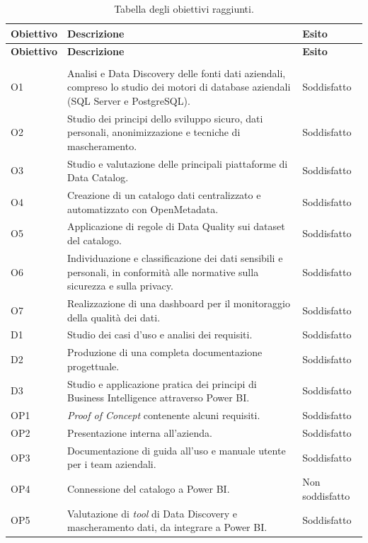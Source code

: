 \begin{longtable}{ p{} p{} p{} }
\toprule
\textbf{Obiettivo} & \textbf{Descrizione} & \textbf{Esito} \\
\midrule
\endfirsthead

\toprule
\textbf{Obiettivo} & \textbf{Descrizione} & \textbf{Esito} \\
\midrule
\endhead

\midrule
\noalign{\vspace{10pt}}
\caption[]{Tabella degli obiettivi raggiunti.} \\
\endfoot

\bottomrule
\noalign{\vspace{10pt}}
\caption{Tabella degli obiettivi raggiunti.}
\label{tab:obiettivi-raggiunti}
\endlastfoot
    O1 & Analisi e Data Discovery delle fonti dati aziendali, compreso lo studio dei motori di database aziendali (SQL Server e PostgreSQL). & Soddisfatto\\ \midrule
    O2 & Studio dei principi dello sviluppo sicuro, dati personali, anonimizzazione e tecniche di mascheramento. & Soddisfatto\\ \midrule
    O3 & Studio e valutazione delle principali piattaforme di Data Catalog. & Soddisfatto\\ \midrule
    O4 & Creazione di un catalogo dati centralizzato e automatizzato con OpenMetadata. & Soddisfatto\\ \midrule
    O5 & Applicazione di regole di Data Quality sui dataset del catalogo. & Soddisfatto\\ \midrule
    O6 & Individuazione e classificazione dei dati sensibili e personali, in conformità alle normative sulla sicurezza e sulla privacy. & Soddisfatto\\ \midrule
    O7 & Realizzazione di una dashboard per il monitoraggio della qualità dei dati. & Soddisfatto\\ \midrule
    D1 & Studio dei casi d'uso e analisi dei requisiti. & Soddisfatto\\ \midrule
    D2 & Produzione di una completa documentazione progettuale. & Soddisfatto\\ \midrule
    D3 & Studio e applicazione pratica dei principi di Business Intelligence attraverso Power BI. & Soddisfatto\\ \midrule
    OP1 & \emph{Proof of Concept} contenente alcuni requisiti. & Soddisfatto\\ \midrule
    OP2 & Presentazione interna all'azienda. & Soddisfatto\\ \midrule
    OP3 & Documentazione di guida all'uso e manuale utente per i team aziendali. & Soddisfatto\\ \midrule
    OP4 & Connessione del catalogo a Power BI. & Non soddisfatto\\ \midrule
    OP5 & Valutazione di \emph{tool} di Data Discovery e mascheramento dati, da integrare a Power BI. & Soddisfatto\\
\end{longtable}


